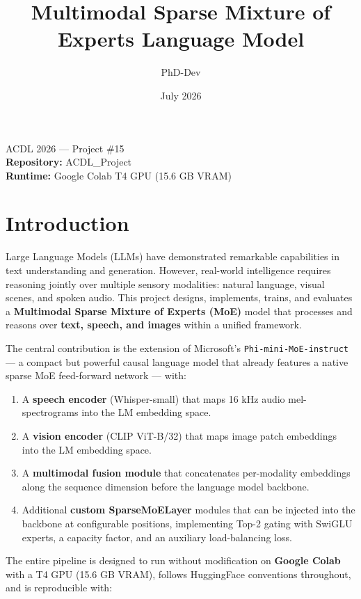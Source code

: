 \documentclass[11pt]{article}
\title{Multimodal Sparse Mixture of Experts Language Model}
\author{PhD-Dev}
\date{July 2026}
\begin{document}
\maketitle
\begin{center}
\large ACDL 2026 — Project \#15\\[0.5em]
\normalsize \textbf{Repository:} ACDL\_Project\\
\normalsize \textbf{Runtime:} Google Colab T4 GPU (15.6 GB VRAM)
\end{center}
\tableofcontents
\newpage
\section{Introduction}


Large Language Models (LLMs) have demonstrated remarkable capabilities in text understanding and generation. However, real-world intelligence requires reasoning jointly over multiple sensory modalities: natural language, visual scenes, and spoken audio. This project designs, implements, trains, and evaluates a \textbf{Multimodal Sparse Mixture of Experts (MoE)} model that processes and reasons over \textbf{text, speech, and images} within a unified framework.


The central contribution is the extension of Microsoft's \texttt{Phi-mini-MoE-instruct} — a compact but powerful causal language model that already features a native sparse MoE feed-forward network — with:


\begin{enumerate}[leftmargin=*]
\item A \textbf{speech encoder} (Whisper-small) that maps 16 kHz audio mel-spectrograms into the LM embedding space.
\item A \textbf{vision encoder} (CLIP ViT-B/32) that maps image patch embeddings into the LM embedding space.
\item A \textbf{multimodal fusion module} that concatenates per-modality embeddings along the sequence dimension before the language model backbone.
\item Additional \textbf{custom SparseMoELayer} modules that can be injected into the backbone at configurable positions, implementing Top-2 gating with SwiGLU experts, a capacity factor, and an auxiliary load-balancing loss.

\end{enumerate}
The entire pipeline is designed to run without modification on \textbf{Google Colab} with a T4 GPU (15.6 GB VRAM), follows HuggingFace conventions throughout, and is reproducible with:
\end{document}
